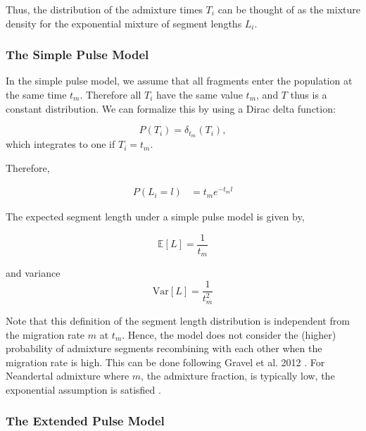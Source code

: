 \documentclass[]{article}
\begin{document}
Thus, the distribution of the admixture times $T_i$ can be thought of as the mixture density for the exponential mixture of segment lengths $L_i$. 

\subsubsection{The Simple Pulse Model}\label{The Simple Pulse Model}


In the simple pulse model, we assume that all fragments enter the population at the same time $t_m$. Therefore all $T_i$ have the same value $t_m$, and $T$ thus is a constant distribution. We can formalize this by using a Dirac delta function:

\begin{equation}
\label{eq:RV_simple_pulse}
  P(T_i)=\delta_{t_m}(T_i),
\end{equation} 
which integrates to one if $T_i = t_m$.


Therefore,

\begin{equation}
\begin{split}
\label{eq:Likelihood_function_simple_pulse}
    P(L_i=l) &= t_me^{-t_m l}
\end{split}
\end{equation}

The expected segment length under a simple pulse model is given by,

\begin{equation}
\label{eq:Expected_l_simple_pulse}
    \mathbb{E}[L]=\frac{1}{t_m}
\end{equation}

and variance
\begin{equation}
\label{eq:Expected_l_simple_pulse}
    \text{Var}[L]=\frac{1}{t_m^2}
\end{equation}


Note that this definition of the segment length distribution is independent from the migration rate $m$ at $t_m$. Hence, the model does not consider the (higher) probability of admixture segments recombining with each other when the migration rate is high. This can be done following Gravel et al. 2012 \citep{gravel_population_2012}. For Neandertal admixture where $m$, the admixture fraction, is typically low, the exponential assumption is satisfied \citep{liang_lengths_2014}.

\subsubsection{The Extended Pulse Model}\label{The Extended Pulse Model}
\end{document}
